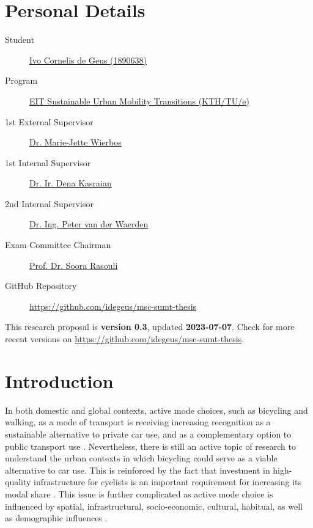 \documentclass[sigconf, natbib=false, nonacm]{acmart}
\begin{document}
\section{Personal Details}
\begin{description}
    \item[Student] \href{mailto:mail4ivo@gmail.com}{Ivo Cornelis de Geus (1890638)}
    \item[Program] \href{https://www.eiturbanmobility.eu/academy/sustainable-urban-mobility-transitions/}{EIT Sustainable Urban Mobility Transitions (KTH/TU/e)}
    \item[1st External Supervisor] \href{mailto:marie-jette.wierbos@sweco.nl}{Dr. Marie-Jette Wierbos}
    \item[1st Internal Supervisor] \href{mailto:d.kasraian@tue.nl}{Dr. Ir. Dena Kasraian}
    \item[2nd Internal Supervisor] \href{mailto:p.j.h.j.v.d.waerden@tue.nl}{Dr. Ing. Peter van der Waerden}
    \item[Exam Committee Chairman] \href{mailto:s.rasouli@tue.nl}{Prof. Dr. Soora Rasouli}
    \item[GitHub Repository] \url{https://github.com/idegeus/msc-sumt-thesis}
\end{description}


This research proposal is \textbf{version 0.3}, updated \textbf{2023-07-07}. Check for more recent versions on \url{https://github.com/idegeus/msc-sumt-thesis}.

\section{Introduction}  
    In both domestic and global contexts, active mode choices, such as bicycling and walking, as a mode of transport is receiving increasing recognition as a sustainable alternative to private car use, and as a complementary option to public transport use \parencite{naess_what_2012, pucher_making_2008, romanillos_cyclists_2020, dekoster_cycling_1999}. Nevertheless, there is still an active topic of research to understand the urban contexts in which bicycling could serve as a viable alternative to car use. This is reinforced by the fact that investment in high-quality infrastructure for cyclists is an important requirement for increasing its modal share \parencite{goodwin_why_2012, pucher_making_2008, buehler_bikeway_2016}. This issue is further complicated as active mode choice is influenced by spatial, infrastructural, socio-economic, cultural, habitual, as well as demographic influences \parencite{naess_built_2015, felix_maturing_2019, oldenziel_contested_2011, ton_unravelling_2019, snellen_urban_2001}. 
    
\end{document}
